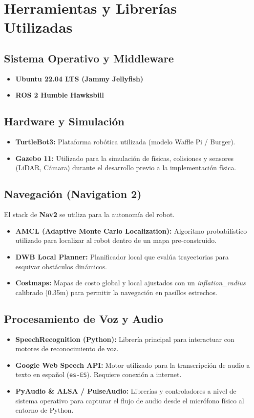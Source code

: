 \documentclass[12pt,a4paper]{article}
\begin{document}
\section{Herramientas y Librerías Utilizadas}

\subsection{Sistema Operativo y Middleware}
\begin{itemize}
    \item \textbf{Ubuntu 22.04 LTS (Jammy Jellyfish)}
    \item \textbf{ROS 2 Humble Hawksbill}
\end{itemize}

\subsection{Hardware y Simulación}
\begin{itemize}
    \item \textbf{TurtleBot3:} Plataforma robótica utilizada (modelo Waffle Pi / Burger).
    \item \textbf{Gazebo 11:} Utilizado para la simulación de físicas, colisiones y sensores (LiDAR, Cámara) durante el desarrollo previo a la implementación física.
\end{itemize}

\subsection{Navegación (Navigation 2)}
El stack de \textbf{Nav2} se utiliza para la autonomía del robot.
\begin{itemize}
    \item \textbf{AMCL (Adaptive Monte Carlo Localization):} Algoritmo probabilístico utilizado para localizar al robot dentro de un mapa pre-construido.
    \item \textbf{DWB Local Planner:} Planificador local que evalúa trayectorias para esquivar obstáculos dinámicos.
    \item \textbf{Costmaps:} Mapas de costo global y local ajustados con un \textit{inflation\_radius} calibrado (0.35m) para permitir la navegación en pasillos estrechos.
\end{itemize}

\subsection{Procesamiento de Voz y Audio}
\begin{itemize}
    \item \textbf{SpeechRecognition (Python):} Librería principal para interactuar con motores de reconocimiento de voz.
    \item \textbf{Google Web Speech API:} Motor utilizado para la transcripción de audio a texto en español (\texttt{es-ES}). Requiere conexión a internet.
    \item \textbf{PyAudio \& ALSA / PulseAudio:} Librerías y controladores a nivel de sistema operativo para capturar el flujo de audio desde el micrófono físico al entorno de Python.
\end{itemize}
\end{document}
